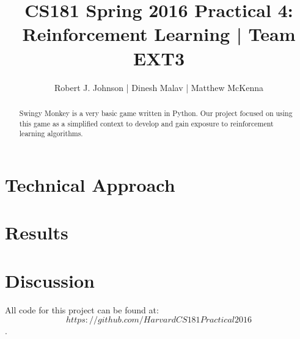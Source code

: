 \documentclass{article}
\begin{document}
\title{CS181 Spring 2016 Practical 4: Reinforcement Learning | Team EXT3}
\author{Robert J. Johnson | Dinesh Malav | Matthew McKenna}


\maketitle

\begin{abstract}
Swingy Monkey is a very basic game written in Python. Our project focused on using this game as a simplified context to develop and gain exposure to reinforcement learning algorithms. 
\end{abstract}
\section{Technical Approach}


\section{Results}


\section{Discussion}

All code for this project can be found at: $$https://github.com/HarvardCS181Practical2016$$.
\end{document}
